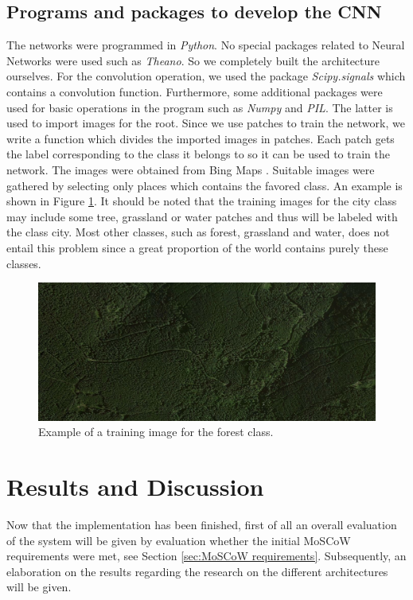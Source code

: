 \documentclass[a4paper,onecolumn]{report}
\begin{document}
\section{Programs and packages to develop the CNN}
The networks were programmed in \textit{Python}. No special packages related to Neural Networks were used such as \textit{Theano}.  So we completely built the architecture ourselves. For the convolution operation, we used the package \textit{Scipy.signals} which contains a convolution function. Furthermore, some additional packages were used for basic operations in the program such as \textit{Numpy} and \textit{PIL}. The latter is used to import images for the root. Since we use patches to train the network, we write a function which divides the imported images in patches. Each patch gets the label corresponding to the class it belongs to so it can be used to train the network. The images were obtained from Bing Maps \cite{bing}. Suitable images were gathered by selecting only places which contains the favored class. An example is shown in Figure \ref{fig:classexample}. It should be noted that the training images for the city class may include some tree, grassland or water patches and thus will be labeled with the class city. Most other classes, such as forest, grassland and water, does not entail this problem since a great proportion of the world contains purely these classes.

\begin{figure}[h!]
    \centering
    \includegraphics[scale=0.4]{./images/classexample.png}
    \caption{Example of a training image for the forest class.}
	\label{fig:classexample}
\end{figure}



\chapter{Results and Discussion}
\label{chap:resultsanddiscussion}
Now that the implementation has been finished, first of all an overall evaluation of the system will be given by evaluation whether the initial MoSCoW requirements were met, see Section \ref{sec:MoSCoW requirements}. Subsequently, an elaboration on the results regarding the research on the different architectures will be given. 
\end{document}
